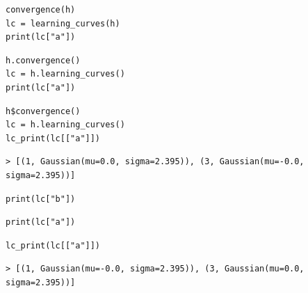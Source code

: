 \documentclass[a4paper,10pt]{book}
\theoremstyle{definition}
\newif\ifen
\newif\ifes
\newcommand{\en}[1]{\ifen#1\fi}
\newcommand{\es}[1]{\ifes#1\fi}
\begin{document}

\en{TrueSkill Through Time solves TrueSkill's inability to obtain correct estimates by allowing the information to propagate throughout the system. }%
\es{TrueSkill Through Time resuelve la incapacidad de TrueSkill para obtener las estimaciones correctas permitiendo que la informaci\'on propague por todo el sistema. }%
%
\en{To compute them, we call the method \texttt{convergence()} of the class \texttt{History}. }%
\es{Para computarlas es necesario llamar al método \texttt{convergence()} de la clase \texttt{History}. }%
%
\begin{lstlisting}[backgroundcolor=\color{white},label=lst:ttt, caption={\en{Computing TrueSkill Through Time learning curves}\es{Computo de curvas de aprendizaje de TrueSkill Through Time}}, belowskip=-1.0 \baselineskip, aboveskip=0.1cm]
\end{lstlisting}
\begin{paracol}{3}
\begin{lstlisting}[backgroundcolor=\color{julia!60}, belowskip=-0.77 \baselineskip]
convergence(h)
lc = learning_curves(h)
print(lc["a"])
\end{lstlisting}
  \switchcolumn
\begin{lstlisting}[backgroundcolor=\color{python!60}, belowskip=-0.77 \baselineskip]
h.convergence()
lc = h.learning_curves()
print(lc["a"])
\end{lstlisting}
   \switchcolumn
\begin{lstlisting}[backgroundcolor=\color{r!50}, belowskip=-0.77 \baselineskip]
h$convergence()
lc = h.learning_curves()
lc_print(lc[["a"]])
\end{lstlisting}
\end{paracol}
\begin{lstlisting}[backgroundcolor=\color{all}, belowskip=-0.77 \baselineskip]
> [(1, Gaussian(mu=0.0, sigma=2.395)), (3, Gaussian(mu=-0.0, sigma=2.395))]
\end{lstlisting}
\begin{paracol}{3}
\begin{lstlisting}[backgroundcolor=\color{julia!60}, belowskip=-0.77 \baselineskip]
print(lc["b"])
\end{lstlisting}
  \switchcolumn
\begin{lstlisting}[backgroundcolor=\color{python!60}, belowskip=-0.77 \baselineskip]
print(lc["a"])
\end{lstlisting}
   \switchcolumn
\begin{lstlisting}[backgroundcolor=\color{r!50}, belowskip=-0.77 \baselineskip]
lc_print(lc[["a"]])
\end{lstlisting}
\end{paracol}
\begin{lstlisting}[backgroundcolor=\color{all}]
> [(1, Gaussian(mu=-0.0, sigma=2.395)), (3, Gaussian(mu=0.0, sigma=2.395))]
\end{lstlisting}
%
\en{TrueSkill Through Time not only returns correct estimates (same for all players), they also have less uncertainty. }%
\es{TrueSkill Through Time no s\'olo devuelve las estimaciones correctas (la misma para todos los jugadores), también tienen menos incertidumbre. }%
\end{document}
